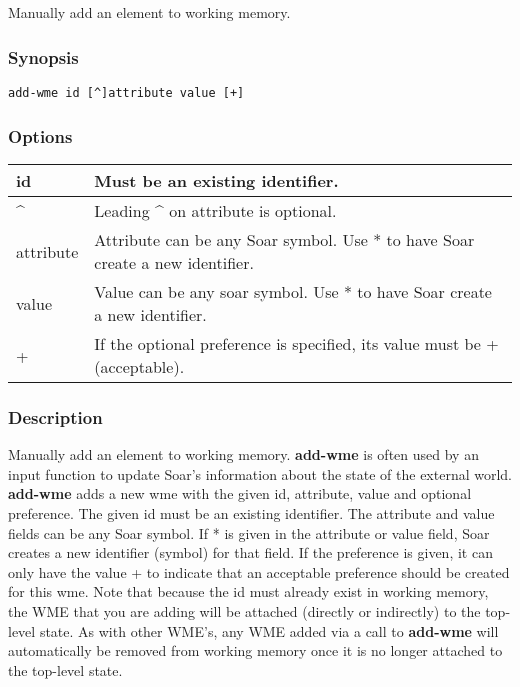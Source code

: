 \subsection{}
\label{add-wme}
Manually add an element to working memory. 
\subsubsection*{Synopsis}
\begin{verbatim}
add-wme id [^]attribute value [+]
\end{verbatim}
\subsubsection*{Options}
\begin{tabular}{|l|l|}
\hline 
 id  & Must be an existing identifier.  \\
 \hline 
 \^{}  & Leading \^{} on attribute is optional.  \\
 \hline 
 attribute  & Attribute can be any Soar symbol. Use * to have Soar create a new identifier.  \\
 \hline 
 value  & Value can be any soar symbol. Use * to have Soar create a new identifier.  \\
 \hline 
 +  & If the optional preference is specified, its value must be + (acceptable).  \\
 \hline 
\end{tabular}
\subsubsection*{Description}
 Manually add an element to working memory. \textbf{add-wme}
 is often used by an input function to update Soar's information about the state of the external world. 
 \textbf{add-wme}
 adds a new wme with the given id, attribute, value and optional preference. The given id must be an existing identifier. The attribute and value fields can be any Soar symbol. If * is given in the attribute or value field, Soar creates a new identifier (symbol) for that field. If the preference is given, it can only have the value + to indicate that an acceptable preference should be created for this wme. 
 Note that because the id must already exist in working memory, the WME that you are adding will be attached (directly or indirectly) to the top-level state. As with other WME's, any WME added via a call to \textbf{add-wme}
 will automatically be removed from working memory once it is no longer attached to the top-level state. 

